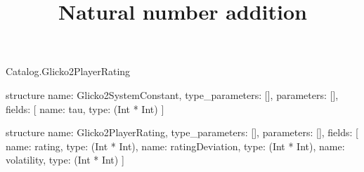 \begin{lexlean}{Catalog.Glicko2PlayerRating}
\title{Natural number addition}
\begin{semanticmodule}
structure{
  name: Glicko2SystemConstant,
  type_parameters: [],
  parameters: [],
  fields: [
    {name: tau, type: (Int * Int)}
  ]
}

structure{
  name: Glicko2PlayerRating,
  type_parameters: [],
  parameters: [],
  fields: [
    {name: rating, type: (Int * Int)},
    {name: ratingDeviation, type: (Int * Int)},
    {name: volatility, type: (Int * Int)}
  ]
}
\end{semanticmodule}
\end{lexlean}
